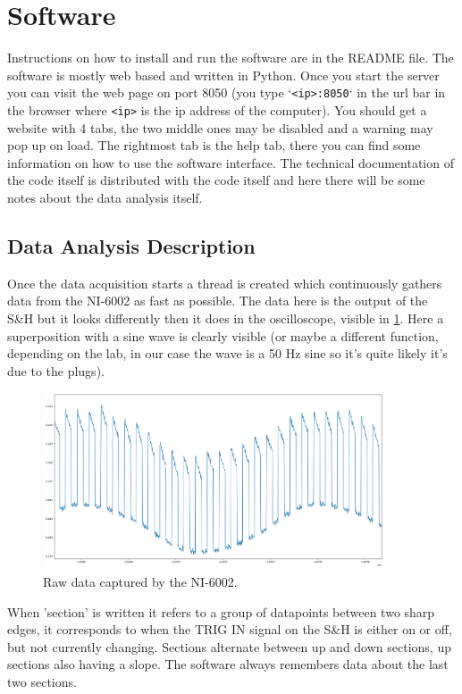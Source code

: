 \documentclass[a4paper, 10pt]{article}
\begin{document}
\section{Software}
Instructions on how to install and run the software are in the README file.
The software is mostly web based and written in Python.
Once you start the server you can visit the web page on port 8050 (you type `\lstinline{<ip>:8050}` in the url bar in the browser where \lstinline{<ip>} is the ip address of the computer).
You should get a website with 4 tabs, the two middle ones may be disabled and a warning may pop up on load.
The rightmost tab is the help tab, there you can find some information on how to use the software interface.
The technical documentation of the code itself is distributed with the code itself and here there will be some notes about the data analysis itself.

\subsection{Data Analysis Description}
Once the data acquisition starts a thread is created which continuously gathers data from the NI-6002 as fast as possible.
The data here is the output of the S\&H but it looks differently then it does in the oscilloscope, visible in \cref{fig:soft-raw-data}.
Here a superposition with a sine wave is clearly visible (or maybe a different function, depending on the lab, in our case the wave is a 50 \si{\hertz} sine so it's quite likely it's due to the plugs).

\begin{figure}[H]
    \centering
    \includegraphics[width=0.9\textwidth]{./images/soft-raw-data.png}
    \caption{Raw data captured by the NI-6002.}
    \label{fig:soft-raw-data}
\end{figure}

When 'section' is written it refers to a group of datapoints between two sharp edges, it corresponds to when the TRIG IN signal on the S\&H is either on or off, but not currently changing.
Sections alternate between up and down sections, up sections also having a slope.
The software always remembers data about the last two sections.
\end{document}
